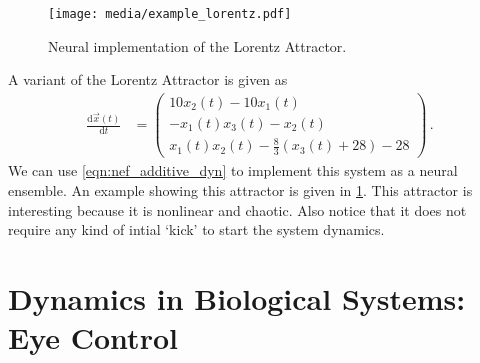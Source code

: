 \documentclass[10pt,letterpaper,oneside]{article}
\begin{document}
\begin{figure}[t]
	\centering
	\texttt{[image: media/example\_lorentz.pdf]}
	\caption{Neural implementation of the Lorentz Attractor. }
	\label{fig:example_lorentz}
\end{figure}

A variant of the Lorentz Attractor is given as
\begin{align*}
	\frac{\mathrm{d}\vec x(t)}{\mathrm{d}t} &= \begin{pmatrix}
		10 x_2(t)-10x_1(t) \\
		-x_1(t) x_3(t)-x_2(t) \\
		 x_1(t) x_2(t) - \frac{8}{3}(x_3(t)+28)-28
	\end{pmatrix} \,.
\end{align*}
We can use \cref{eqn:nef_additive_dyn} to implement this system as a neural ensemble. An example showing this attractor is given in \cref{fig:example_lorentz}. This attractor is interesting because it is nonlinear and chaotic. Also notice that it does not require any kind of intial `kick' to start the system dynamics. 

%
%
%
%

\section{Dynamics in Biological Systems: Eye Control}
\end{document}

